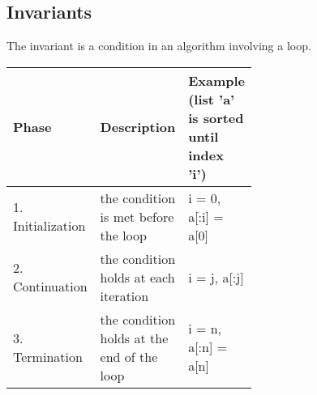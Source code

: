 \subsection{Invariants}
The invariant is a condition in an algorithm involving a loop.\\
\begin{tabular}{l | p{0.3\linewidth} | p{0.3\linewidth}}
    Phase & Description & Example (list 'a' is sorted until index 'i')\\
    \hline \hline
    1. Initialization & the condition is met before the loop & i = 0, a[:i] = a[0] \\
    \hline
    2. Continuation & the condition holds at each iteration & i = j, a[:j] \\
    \hline
    3. Termination & the condition holds at the end of the loop & i = n, a[:n] = a[n]
\end{tabular}